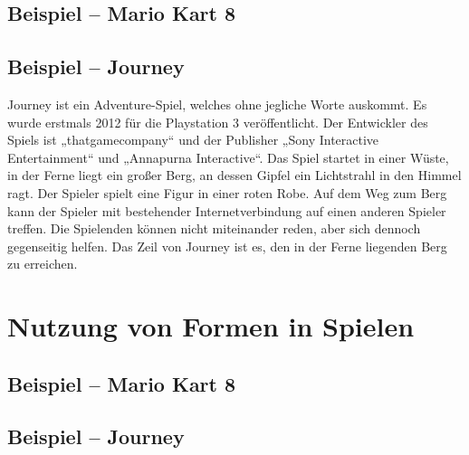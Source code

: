 \subsection{Beispiel – Mario Kart 8}

\subsection{Beispiel – Journey}
Journey ist ein Adventure-Spiel, welches ohne jegliche Worte auskommt. Es wurde erstmals 2012 für die Playstation 3 veröffentlicht. Der Entwickler des Spiels ist „thatgamecompany“ und der Publisher „Sony Interactive Entertainment“ und „Annapurna Interactive“. Das Spiel startet in einer Wüste, in der Ferne liegt ein großer Berg, an dessen Gipfel ein Lichtstrahl in den Himmel ragt. Der Spieler spielt eine Figur in einer roten Robe. Auf dem Weg zum Berg kann der Spieler mit bestehender Internetverbindung auf einen anderen Spieler treffen. Die Spielenden können nicht miteinander reden, aber sich dennoch gegenseitig helfen. Das Zeil von Journey ist es, den in der Ferne liegenden Berg zu erreichen. 


\section{Nutzung von Formen in Spielen}

\subsection{Beispiel – Mario Kart 8}

\subsection{Beispiel – Journey}



